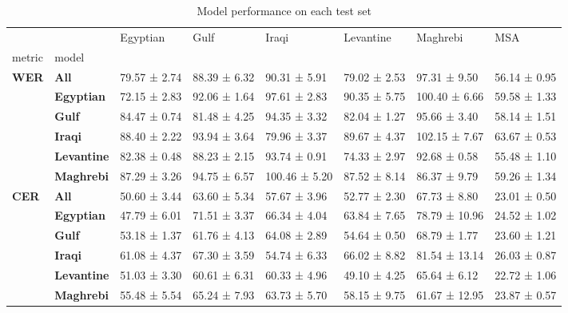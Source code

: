 \begin{table}
\caption{Model performance on each test set}
\label{tab:ex_finetune}
\begin{tabular}{llllllll}
\toprule
 &  & Egyptian & Gulf & Iraqi & Levantine & Maghrebi & MSA \\
metric & model &  &  &  &  &  &  \\
\midrule
\multirow[t]{6}{*}{\textbf{WER}} & \textbf{All} & 79.57 ± 2.74 & 88.39 ± 6.32 & 90.31 ± 5.91 & 79.02 ± 2.53 & 97.31 ± 9.50 & 56.14 ± 0.95 \\
\textbf{} & \textbf{Egyptian} & 72.15 ± 2.83 & 92.06 ± 1.64 & 97.61 ± 2.83 & 90.35 ± 5.75 & 100.40 ± 6.66 & 59.58 ± 1.33 \\
\textbf{} & \textbf{Gulf} & 84.47 ± 0.74 & 81.48 ± 4.25 & 94.35 ± 3.32 & 82.04 ± 1.27 & 95.66 ± 3.40 & 58.14 ± 1.51 \\
\textbf{} & \textbf{Iraqi} & 88.40 ± 2.22 & 93.94 ± 3.64 & 79.96 ± 3.37 & 89.67 ± 4.37 & 102.15 ± 7.67 & 63.67 ± 0.53 \\
\textbf{} & \textbf{Levantine} & 82.38 ± 0.48 & 88.23 ± 2.15 & 93.74 ± 0.91 & 74.33 ± 2.97 & 92.68 ± 0.58 & 55.48 ± 1.10 \\
\textbf{} & \textbf{Maghrebi} & 87.29 ± 3.26 & 94.75 ± 6.57 & 100.46 ± 5.20 & 87.52 ± 8.14 & 86.37 ± 9.79 & 59.26 ± 1.34 \\
\cline{1-8}
\multirow[t]{6}{*}{\textbf{CER}} & \textbf{All} & 50.60 ± 3.44 & 63.60 ± 5.34 & 57.67 ± 3.96 & 52.77 ± 2.30 & 67.73 ± 8.80 & 23.01 ± 0.50 \\
\textbf{} & \textbf{Egyptian} & 47.79 ± 6.01 & 71.51 ± 3.37 & 66.34 ± 4.04 & 63.84 ± 7.65 & 78.79 ± 10.96 & 24.52 ± 1.02 \\
\textbf{} & \textbf{Gulf} & 53.18 ± 1.37 & 61.76 ± 4.13 & 64.08 ± 2.89 & 54.64 ± 0.50 & 68.79 ± 1.77 & 23.60 ± 1.21 \\
\textbf{} & \textbf{Iraqi} & 61.08 ± 4.37 & 67.30 ± 3.59 & 54.74 ± 6.33 & 66.02 ± 8.82 & 81.54 ± 13.14 & 26.03 ± 0.87 \\
\textbf{} & \textbf{Levantine} & 51.03 ± 3.30 & 60.61 ± 6.31 & 60.33 ± 4.96 & 49.10 ± 4.25 & 65.64 ± 6.12 & 22.72 ± 1.06 \\
\textbf{} & \textbf{Maghrebi} & 55.48 ± 5.54 & 65.24 ± 7.93 & 63.73 ± 5.70 & 58.15 ± 9.75 & 61.67 ± 12.95 & 23.87 ± 0.57 \\
\cline{1-8}
\bottomrule
\end{tabular}
\end{table}
